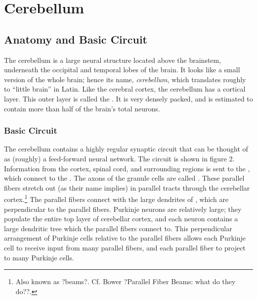 \chapter{Cerebellum}

\section{Anatomy and Basic Circuit}



The cerebellum is a large neural structure located above the brainstem, underneath the occipital and temporal lobes of the brain. It looks like a small version of the whole brain; hence its name, \emph{cerebellum}, which translates roughly to ``little brain'' in Latin. Like the cerebral cortex, the cerebellum has a cortical layer. This outer layer is called the . It is very densely packed, and is estimated to contain more than half of the brain's total neurons.



\subsection{Basic Circuit}
 
The cerebellum contains a highly regular synaptic circuit that can be thought of as (roughly) a feed-forward neural network. The circuit is shown in figure 2. Information from the cortex, spinal cord, and surrounding regions is sent to the 
, which connect to the . The axons of the granule cells are called . These parallel fibers stretch out (as their name implies) in parallel tracts through the cerebellar cortex.\footnote{Also known as ?beams?. Cf. Bower ?Parallel Fiber Beams: what do they do??.}  The parallel fibers connect with the large dendrites of  , which are perpendicular to the parallel fibers. Purkinje neurons are relatively large; they populate the entire top layer of cerebellar cortex, and each neuron contains a large dendritic tree which the parallel fibers connect to. This perpendicular arrangement of Purkinje cells relative to the parallel fibers allows each Purkinje cell to receive input from many parallel fibers, and each parallel fiber to project to many Purkinje cells.
 
